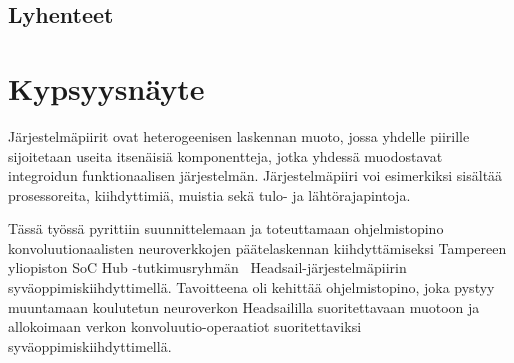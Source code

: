 \documentclass[12pt,a4paper,finnish
]{tunithesis}
\begin{document}







\clearpage

\section*{Lyhenteet}
\begin{acronym}
\end{acronym}


\clearpage


\setcounter{tocdepth}{3}              %
\tableofcontents                      %

\if@twoside
\cleardoublepage
\fi


\renewcommand{\chaptername}{} %


\chapter{Kypsyysnäyte}
\label{ch:introduction}
\setcounter{page}{1} %

Järjestelmäpiirit ovat heterogeenisen laskennan muoto, jossa yhdelle piirille sijoitetaan useita itsenäisiä komponentteja, jotka yhdessä muodostavat integroidun funktionaalisen järjestelmän.
Järjestelmäpiiri voi esimerkiksi sisältää prosessoreita, kiihdyttimiä, muistia sekä tulo- ja lähtörajapintoja.

Tässä työssä pyrittiin suunnittelemaan ja toteuttamaan ohjelmistopino konvoluutionaalisten neuroverkkojen päätelaskennan kiihdyttämiseksi Tampereen yliopiston SoC Hub -tutkimusryhmän~\cite{keelhaul} Headsail-järjestelmäpiirin sy\-vä\-op\-pi\-mis\-kiih\-dy\-tti\-me\-llä.
Tavoitteena oli kehittää ohjelmistopino, joka pystyy muuntamaan koulutetun neuroverkon Headsaililla suoritettavaan muotoon ja allokoimaan verkon konvoluutio-operaatiot suoritettaviksi syväoppimiskiihdyttimellä.
\end{document}
